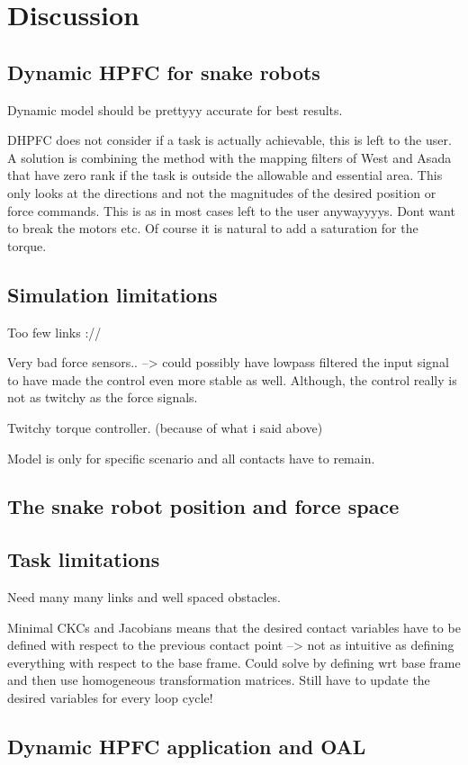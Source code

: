 \chapter{Discussion}\label{ch:discussion}


\section{Dynamic HPFC for snake robots}

Dynamic model should be prettyyy accurate for best results.

DHPFC does not consider if a task is actually achievable, this is left to the user. A solution is combining the method with the mapping filters of West and Asada that have zero rank if the task is outside the allowable and essential area. This only looks at the directions and not the magnitudes of the desired position or force commands. This is as in most cases left to the user anywayyyys. Dont want to break the motors etc. Of course it is natural to add a saturation for the torque.

\section{Simulation limitations}

Too few links ://

Very bad force sensors.. --> could possibly have lowpass filtered the input signal to have made the control even more stable as well. Although, the control really is not as twitchy as the force signals.

Twitchy torque controller. (because of what i said above)

Model is only for specific scenario and all contacts have to remain.

\section{The snake robot position and force space}

\section{Task limitations}

Need many many links and well spaced obstacles.

Minimal CKCs and Jacobians means that the desired contact variables have to be defined with respect to the previous contact point --> not as intuitive as defining everything with respect to the base frame. Could solve by defining wrt base frame and then use homogeneous transformation matrices. Still have to update the desired variables for every loop cycle!

\section{Dynamic HPFC application and OAL}